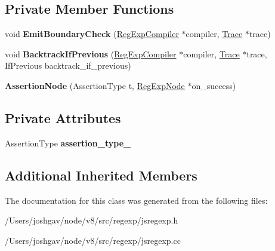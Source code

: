 \subsection*{Private Member Functions}
\begin{DoxyCompactItemize}
\item 
void {\bfseries Emit\+Boundary\+Check} (\hyperlink{classv8_1_1internal_1_1_reg_exp_compiler}{Reg\+Exp\+Compiler} $\ast$compiler, \hyperlink{classv8_1_1internal_1_1_trace}{Trace} $\ast$trace)\hypertarget{classv8_1_1internal_1_1_assertion_node_a22d9c5e07650f93a6d8e1926ad0648fa}{}\label{classv8_1_1internal_1_1_assertion_node_a22d9c5e07650f93a6d8e1926ad0648fa}

\item 
void {\bfseries Backtrack\+If\+Previous} (\hyperlink{classv8_1_1internal_1_1_reg_exp_compiler}{Reg\+Exp\+Compiler} $\ast$compiler, \hyperlink{classv8_1_1internal_1_1_trace}{Trace} $\ast$trace, If\+Previous backtrack\+\_\+if\+\_\+previous)\hypertarget{classv8_1_1internal_1_1_assertion_node_acfb79f9a1c09f0b229824c80ad6896b1}{}\label{classv8_1_1internal_1_1_assertion_node_acfb79f9a1c09f0b229824c80ad6896b1}

\item 
{\bfseries Assertion\+Node} (Assertion\+Type t, \hyperlink{classv8_1_1internal_1_1_reg_exp_node}{Reg\+Exp\+Node} $\ast$on\+\_\+success)\hypertarget{classv8_1_1internal_1_1_assertion_node_a19046ae302406d1553a53ce2d073f734}{}\label{classv8_1_1internal_1_1_assertion_node_a19046ae302406d1553a53ce2d073f734}

\end{DoxyCompactItemize}
\subsection*{Private Attributes}
\begin{DoxyCompactItemize}
\item 
Assertion\+Type {\bfseries assertion\+\_\+type\+\_\+}\hypertarget{classv8_1_1internal_1_1_assertion_node_a86e376475ad1dc573eb10c8ccc076ab4}{}\label{classv8_1_1internal_1_1_assertion_node_a86e376475ad1dc573eb10c8ccc076ab4}

\end{DoxyCompactItemize}
\subsection*{Additional Inherited Members}


The documentation for this class was generated from the following files\+:\begin{DoxyCompactItemize}
\item 
/\+Users/joshgav/node/v8/src/regexp/jsregexp.\+h\item 
/\+Users/joshgav/node/v8/src/regexp/jsregexp.\+cc\end{DoxyCompactItemize}
